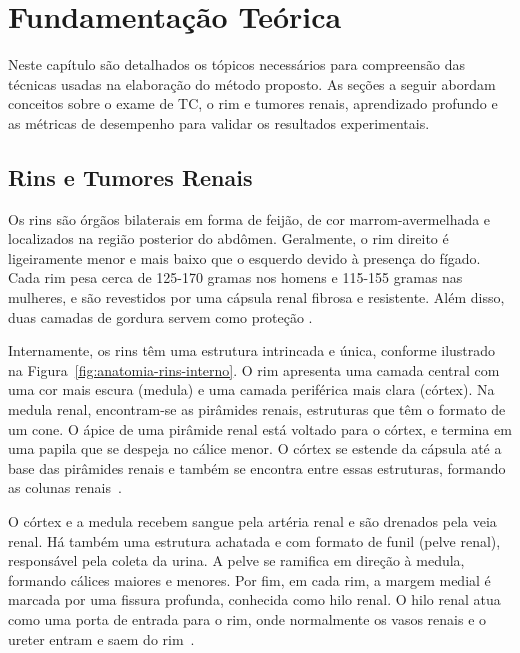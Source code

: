 \chapter{Fundamentação Teórica}
\label{cap:fundamentacao-teorica}
\phantom{0}

Neste capítulo são detalhados os tópicos necessários para compreensão das técnicas usadas na elaboração do método proposto. As seções a seguir abordam conceitos sobre o exame de TC, o rim e tumores renais, aprendizado profundo e as métricas de desempenho para validar os resultados experimentais.

\section{Rins e Tumores Renais}
\label{sec:rins-e-tumores-renais}

Os rins são órgãos bilaterais em forma de feijão, de cor marrom-avermelhada e localizados na região posterior do abdômen. Geralmente, o rim direito é ligeiramente menor e mais baixo que o esquerdo devido à presença do fígado. Cada rim pesa cerca de 125-170 gramas nos homens e 115-155 gramas nas mulheres, e são revestidos por uma cápsula renal fibrosa e resistente. Além disso, duas camadas de gordura servem como proteção \cite{tim_newman}.

Internamente, os rins têm uma estrutura intrincada e única, conforme ilustrado na Figura~\ref{fig:anatomia-rins-interno}. O rim apresenta uma camada central com uma cor mais escura (medula) e uma camada periférica mais clara (córtex). Na medula renal, encontram-se as pirâmides renais, estruturas que têm o formato de um cone. O ápice de uma pirâmide renal está voltado para o córtex, e termina em uma papila que se despeja no cálice menor. O córtex se estende da cápsula até a base das pirâmides renais e também se encontra entre essas estruturas, formando as colunas renais~\cite{oliver_jones,vanessa_sardinha}.

O córtex e a medula recebem sangue pela artéria renal e são drenados pela veia renal. Há também uma estrutura achatada e com formato de funil (pelve renal), responsável pela coleta da urina. A pelve se ramifica em direção à medula, formando cálices maiores e menores. Por fim, em cada rim, a margem medial é marcada por uma fissura profunda, conhecida como hilo renal. O hilo renal atua como uma porta de entrada para o rim, onde normalmente os vasos renais e o ureter entram e saem do rim~\cite{oliver_jones,vanessa_sardinha,tim_newman}.

